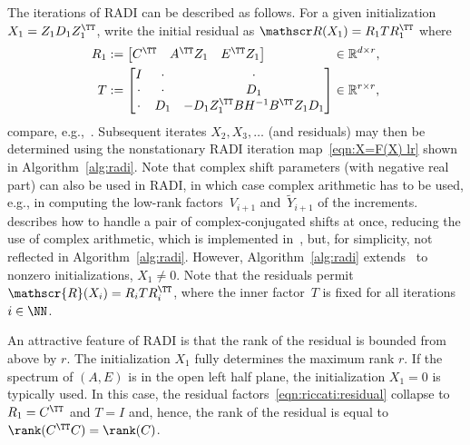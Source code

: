The iterations of RADI can be described as follows.
For a given initialization $X_1 = Z_1 D_1 Z_1^\TT$,
write the initial residual as
\begin{math}
	\mathscr R(X_1) = R_1 T R_1^\TT
\end{math}
where
\begin{equation}
\begin{alignedat}{2}
	R_1 &:= \begin{bmatrix}
		C^\TT & A^\TT Z_1 & E^\TT Z_1
	\end{bmatrix}
	&&\in\mathbb{R}^{d\times r}
	,
	\\
	T &:= \begin{bmatrix}
		I & \cdot & \cdot \\
		\cdot & \cdot & D_1 \\
		\cdot & D_1 & - D_1Z_1^\TT B H^{-1} B^\TT Z_1 D_1
	\end{bmatrix}
	&&\in\mathbb{R}^{r\times r}
	,
\end{alignedat}
\label{eqn:riccati:residual}
\end{equation}
compare, e.g.,~\cite{BenLP08}.
Subsequent iterates $X_2, X_3, \ldots$ (and residuals) may then be determined using
the nonstationary RADI iteration map~\eqref{eqn:X=F(X) lr} shown in Algorithm~\ref{alg:radi}.
Note that complex shift parameters (with negative real part) can also be used in RADI, in which case complex arithmetic has to be used, e.g., in computing the low-rank factors~$V_{i+1}$ and~$\tilde Y_{i+1}$ of the increments.
\cite[Proposition~3]{benner2018radi} describes how to handle a pair of complex-conjugated shifts at once, %
reducing the use of complex arithmetic,
which is implemented in~\cite[\texttt{mess\_lrradi}]{SaaKB-mmess-all-versions},
but, for simplicity, not reflected in Algorithm~\ref{alg:radi}.
However, Algorithm~\ref{alg:radi}
extends~\cite[formula~(12)]{benner2018radi} to nonzero initializations, $X_1\neq 0$.
Note that the residuals permit $\mathscr{R}(X_i) = R_i T R_i^\TT$,
where the inner factor~$T$ is fixed for all iterations $i\in\NN$.

An attractive feature of RADI is that the rank of the residual is bounded from above by $r$.
The initialization $X_1$ fully determines the maximum rank $r$.
If the spectrum of $(A, E)$ is in the open left half plane, the initialization $X_1 = 0$ is typically used.
In this case,
the residual factors~\eqref{eqn:riccati:residual} collapse to $R_1=C^\TT$ and $T=I$ and,
hence, the rank of the residual is equal to $\rank(C^\TT C)=\rank(C)$.

